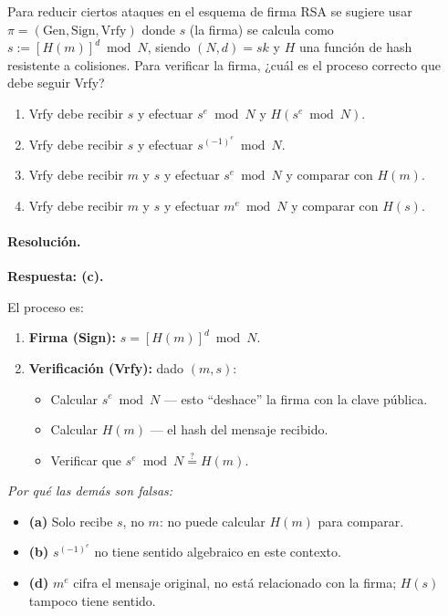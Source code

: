 \documentclass[11pt,a4paper]{article}
\begin{document}
\begin{consignabox}
Para reducir ciertos ataques en el esquema de firma RSA se sugiere usar $\pi = (\text{Gen}, \text{Sign}, \text{Vrfy})$ donde $s$ (la firma) se calcula como $s := [H(m)]^d \bmod N$, siendo $(N,d) = sk$ y $H$ una función de hash resistente a colisiones. Para verificar la firma, ¿cuál es el proceso correcto que debe seguir Vrfy?

\begin{enumerate}[label=(\alph*)]
  \item Vrfy debe recibir $s$ y efectuar $s^e \bmod N$ y $H(s^e \bmod N)$.
  \item Vrfy debe recibir $s$ y efectuar $s^{(-1)^e} \bmod N$.
  \item Vrfy debe recibir $m$ y $s$ y efectuar $s^e \bmod N$ y comparar con $H(m)$.
  \item Vrfy debe recibir $m$ y $s$ y efectuar $m^e \bmod N$ y comparar con $H(s)$.
\end{enumerate}
\end{consignabox}

\paragraph{Resolución.}

\textbf{Respuesta: (c).}

El proceso es:
\begin{enumerate}
  \item \textbf{Firma (Sign):} $s = [H(m)]^d \bmod N$.
  \item \textbf{Verificación (Vrfy):} dado $(m, s)$:
  \begin{itemize}
    \item Calcular $s^e \bmod N$ --- esto ``deshace'' la firma con la clave pública.
    \item Calcular $H(m)$ --- el hash del mensaje recibido.
    \item Verificar que $s^e \bmod N \stackrel{?}{=} H(m)$.
  \end{itemize}
\end{enumerate}

\emph{Por qué las demás son falsas:}
\begin{itemize}
  \item \textbf{(a)} Solo recibe $s$, no $m$: no puede calcular $H(m)$ para comparar.
  \item \textbf{(b)} $s^{(-1)^e}$ no tiene sentido algebraico en este contexto.
  \item \textbf{(d)} $m^e$ cifra el mensaje original, no está relacionado con la firma; $H(s)$ tampoco tiene sentido.
\end{itemize}
\end{document}
